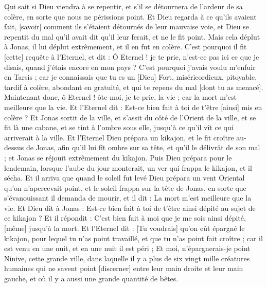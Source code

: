 \begin{multicols}{2}
Qui sait si Dieu viendra à se repentir, et s'il se détournera de l'ardeur de sa colère, en sorte que nous ne périssions point.
Et Dieu regarda à ce qu'ils avaient fait, [savoir] comment ils s'étaient détournés de leur mauvaise voie, et Dieu se repentit du mal qu'il avait dit qu'il leur ferait, et ne le fit point.
\VerseOne{}Mais cela déplut à Jonas, il lui déplut extrêmement, et il en fut en colère.
C'est pourquoi il fit [cette] requête à l'Eternel, et dit : Ô Eternel ! je te prie, n'est-ce pas ici ce que je disais, quand j'étais encore en mon pays ? C'est pourquoi j'avais voulu m'enfuir en Tarsis ; car je connaissais que tu es un [Dieu] Fort, miséricordieux, pitoyable, tardif à colère, abondant en gratuité, et qui te repens du mal [dont tu as menacé].
Maintenant donc, ô Eternel ! ôte-moi, je te prie, la vie ; car la mort m'est meilleure que la vie.
Et l'Eternel dit : Est-ce bien fait à toi de t'être [ainsi] mis en colère ?
Et Jonas sortit de la ville, et s'assit du côté de l'Orient de la ville, et se fit là une cabane, et se tint à l'ombre sous elle, jusqu'à ce qu'il vît ce qui arriverait à la ville.
Et l'Eternel Dieu prépara un kikajon, et le fit croître au-dessus de Jonas, afin qu'il lui fît ombre sur sa tête, et qu'il le délivrât de son mal ; et Jonas se réjouit extrêmement du kikajon.
Puis Dieu prépara pour le lendemain, lorsque l'aube du jour monterait, un ver qui frappa le kikajon, et il sécha.
Et il arriva que quand le soleil fut levé Dieu prépara un vent Oriental qu'on n'apercevait point, et le soleil frappa sur la tête de Jonas, en sorte que s'évanouissant il demanda de mourir, et il dit : La mort m'est meilleure que la vie.
Et Dieu dit à Jonas : Est-ce bien fait à toi de t'être ainsi dépité au sujet de ce kikajon ? Et il répondit : C'est bien fait à moi que je me sois ainsi dépité, [même] jusqu'à la mort.
Et l'Eternel dit : [Tu voudrais] qu'on eût épargné le kikajon, pour lequel tu n'as point travaillé, et que tu n'as point fait croître ; car il est venu en une nuit, et en une nuit il est péri ;
Et moi, n'épargnerais-je point Ninive, cette grande ville, dans laquelle il y a plus de six vingt mille créatures humaines qui ne savent point [discerner] entre leur main droite et leur main gauche, et où il y a aussi une grande quantité de bêtes.
\PPE{}
\end{multicols}
